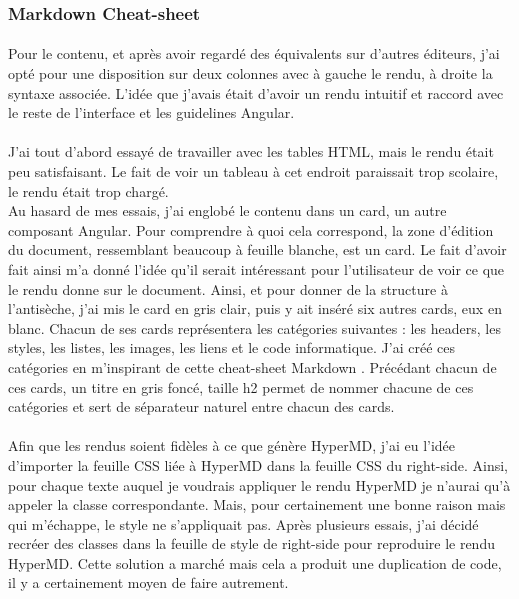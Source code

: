 \documentclass[12pt]{article}
\begin{document}
\subsubsection{Markdown Cheat-sheet}
\paragraph{}
Pour le contenu, et après avoir regardé des équivalents sur d'autres éditeurs, j'ai opté pour une disposition sur deux colonnes avec à gauche le rendu, à droite la syntaxe associée. L'idée que j'avais était d'avoir un rendu intuitif et raccord avec le reste de l'interface et les guidelines Angular.
\paragraph{}
J'ai tout d'abord essayé de travailler avec les tables HTML, mais le rendu était peu satisfaisant. Le fait de voir un tableau à cet endroit paraissait trop scolaire, le rendu était trop chargé.\\
Au hasard de mes essais, j'ai englobé le contenu dans un card, un autre composant Angular. Pour comprendre à quoi cela correspond, la zone d'édition du document, ressemblant beaucoup à feuille blanche, est un card. Le fait d'avoir fait ainsi m'a donné l'idée qu'il serait intéressant pour l'utilisateur de voir ce que le rendu donne sur le document. Ainsi, et pour donner de la structure à l'antisèche, j'ai mis le card en gris clair, puis y ait inséré six autres cards, eux en blanc. Chacun de ses cards représentera les catégories suivantes : les headers, les styles, les listes, les images, les liens et le code informatique. J'ai créé ces catégories en m'inspirant de cette cheat-sheet Markdown \cite{mdcheat}. Précédant chacun de ces cards, un titre en gris foncé, taille h2 permet de nommer chacune de ces catégories et sert de séparateur naturel entre chacun des cards.
\paragraph{}
Afin que les rendus soient fidèles à ce que génère HyperMD, j'ai eu l'idée d'importer la feuille CSS liée à HyperMD dans la feuille CSS du right-side. Ainsi, pour chaque texte auquel je voudrais appliquer le rendu HyperMD je n'aurai qu'à appeler la classe correspondante. Mais, pour certainement une bonne raison mais qui m'échappe, le style ne s'appliquait pas. Après plusieurs essais, j'ai décidé recréer des classes dans la feuille de style de right-side pour reproduire le rendu HyperMD.
Cette solution a marché mais cela a produit une duplication de code, il y a certainement moyen de faire autrement.
\end{document}
